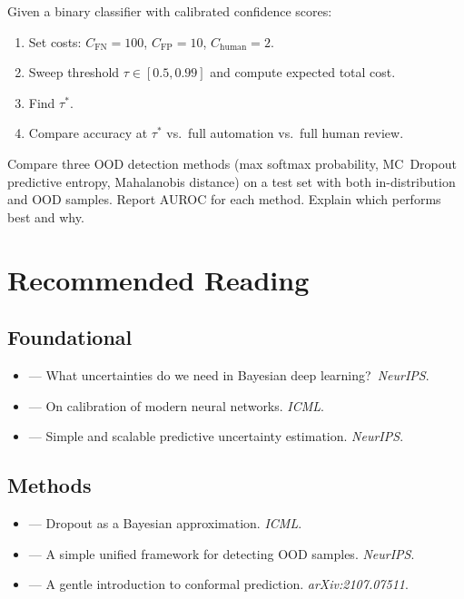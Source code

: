 \begin{Exercise}
Given a binary classifier with calibrated confidence scores:
\begin{enumerate}
    \item Set costs: $C_{\text{FN}} = 100$, $C_{\text{FP}} = 10$, $C_{\text{human}} = 2$.
    \item Sweep threshold $\tau \in [0.5, 0.99]$ and compute expected total cost.
    \item Find $\tau^*$.
    \item Compare accuracy at $\tau^*$ vs.\ full automation vs.\ full human review.
\end{enumerate}
\end{Exercise}

\begin{Exercise}
Compare three OOD detection methods (max softmax probability, MC~Dropout predictive entropy, Mahalanobis distance) on a test set with both in-distribution and OOD samples. Report AUROC for each method. Explain which performs best and why.
\end{Exercise}

\section{Recommended Reading}

\subsection*{Foundational}
\begin{itemize}
    \item \textcite{kendall2017uncertainties} --- What uncertainties do we need in Bayesian deep learning?\ \emph{NeurIPS}.
    \item \textcite{guo2017calibration} --- On calibration of modern neural networks. \emph{ICML}.
    \item \textcite{lakshminarayanan2017simple} --- Simple and scalable predictive uncertainty estimation. \emph{NeurIPS}.
\end{itemize}

\subsection*{Methods}
\begin{itemize}
    \item \textcite{gal2016dropout} --- Dropout as a Bayesian approximation. \emph{ICML}.
    \item \textcite{lee2018simple} --- A simple unified framework for detecting OOD samples. \emph{NeurIPS}.
    \item \textcite{angelopoulos2021gentle} --- A gentle introduction to conformal prediction. \emph{arXiv:2107.07511}.
\end{itemize}

